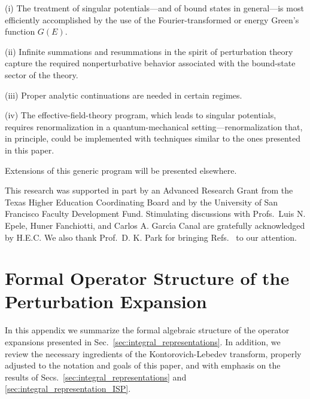\documentclass[a4paper,preprint,draft,showpacs,amsmath,amsfonts,amssymb,aps,prd]{revtex4}%
\begin{document}
(i)  The treatment of singular potentials---and of bound states in 
general---is most
efficiently accomplished by the use of 
the Fourier-transformed or energy Green's function $G(E)$.

(ii) Infinite summations and resummations in the spirit of perturbation theory
capture
the required nonperturbative behavior associated with the bound-state
sector of the theory.
 
(iii) Proper analytic continuations are needed in certain regimes.

(iv) The effective-field-theory program, which  
leads to singular potentials, requires renormalization
in a quantum-mechanical setting---renormalization that,
in principle, could be implemented with
techniques similar to the ones presented in this paper.

Extensions of this generic program will be presented elsewhere.

\begin{acknowledgments}
This research was supported in part by
an Advanced Research Grant from the Texas
Higher Education Coordinating Board 
and by the University of San Francisco Faculty Development Fund.
Stimulating
discussions with Profs.\ 
Luis N. Epele, Huner Fanchiotti,
 and Carlos A. Garc\'{\i}a Canal
are gratefully acknowledged by H.E.C.
We also thank Prof.\ D. K. Park
for bringing Refs.~\cite{Randall-Sundrum,Park} to our attention.

\end{acknowledgments}

\appendix*

\section{Formal Operator Structure of the Perturbation Expansion}
\label{sec:formal_operator_expansion}


In this appendix we summarize the formal algebraic structure of the
operator expansions presented in Sec.~\ref{sec:integral_representations}.
In addition,
we review the necessary ingredients of the Kontorovich-Lebedev transform, 
properly adjusted to the notation and goals of this paper,
and with emphasis on the results of 
Secs.~\ref{sec:integral_representations} and \ref{sec:integral_representation_ISP}.
\end{document}
